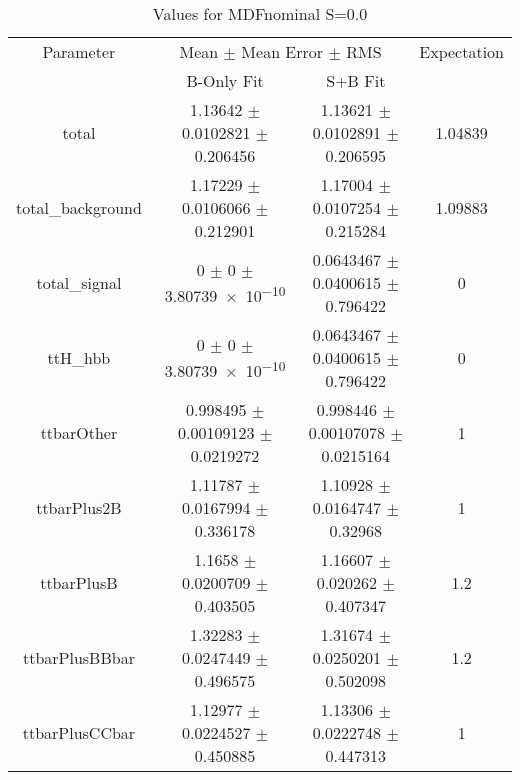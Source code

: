 \begin{table}
\centering
\caption{Values for MDFnominal S=0.0}
\begin{tabular}{cccc}
\toprule
Parameter & \multicolumn{2}{c}{Mean $\pm$ Mean Error $\pm$ RMS} & Expectation\\
 & B-Only Fit & S+B Fit & \\
\midrule
total & \num{1.13642} $\pm$ \num{0.0102821} $\pm$ \num{0.206456} & \num{1.13621} $\pm$ \num{0.0102891} $\pm$ \num{0.206595} & \num{1.04839}\\
total\_background & \num{1.17229} $\pm$ \num{0.0106066} $\pm$ \num{0.212901} & \num{1.17004} $\pm$ \num{0.0107254} $\pm$ \num{0.215284} & \num{1.09883}\\
total\_signal & \num{0} $\pm$ \num{0} $\pm$ \num{3.80739e-10} & \num{0.0643467} $\pm$ \num{0.0400615} $\pm$ \num{0.796422} & \num{0}\\
ttH\_hbb & \num{0} $\pm$ \num{0} $\pm$ \num{3.80739e-10} & \num{0.0643467} $\pm$ \num{0.0400615} $\pm$ \num{0.796422} & \num{0}\\
ttbarOther & \num{0.998495} $\pm$ \num{0.00109123} $\pm$ \num{0.0219272} & \num{0.998446} $\pm$ \num{0.00107078} $\pm$ \num{0.0215164} & \num{1}\\
ttbarPlus2B & \num{1.11787} $\pm$ \num{0.0167994} $\pm$ \num{0.336178} & \num{1.10928} $\pm$ \num{0.0164747} $\pm$ \num{0.32968} & \num{1}\\
ttbarPlusB & \num{1.1658} $\pm$ \num{0.0200709} $\pm$ \num{0.403505} & \num{1.16607} $\pm$ \num{0.020262} $\pm$ \num{0.407347} & \num{1.2}\\
ttbarPlusBBbar & \num{1.32283} $\pm$ \num{0.0247449} $\pm$ \num{0.496575} & \num{1.31674} $\pm$ \num{0.0250201} $\pm$ \num{0.502098} & \num{1.2}\\
ttbarPlusCCbar & \num{1.12977} $\pm$ \num{0.0224527} $\pm$ \num{0.450885} & \num{1.13306} $\pm$ \num{0.0222748} $\pm$ \num{0.447313} & \num{1}\\
\bottomrule
\end{tabular}
\end{table}